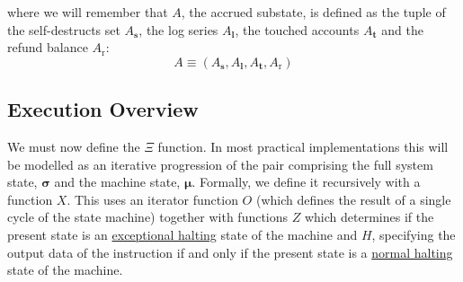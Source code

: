 \documentclass[9pt,oneside]{amsart}
\begin{document}
\begin{multicols}{2}
where we will remember that $A$, the accrued substate, is defined as the tuple of the self-destructs set $A_{\mathbf{s}}$, the log series $A_{\mathbf{l}}$, the touched accounts $A_{\mathbf{t}}$ and the refund balance $A_{\mathrm{r}}$:
\begin{equation}
A \equiv (A_{\mathbf{s}}, A_{\mathbf{l}}, A_{\mathbf{t}}, A_{\mathrm{r}})
\end{equation}

\subsection{Execution Overview}

We must now define the $\Xi$ function. In most practical implementations this will be modelled as an iterative progression of the pair comprising the full system state, $\boldsymbol{\sigma}$ and the machine state, $\boldsymbol{\mu}$. Formally, we define it recursively with a function $X$. This uses an iterator function $O$ (which defines the result of a single cycle of the state machine) together with functions \hyperlink{zhalt}{$Z$} which determines if the present state is an \hyperlink{zhalt}{exceptional halting} state of the machine and \hyperlink{hhalt}{$H$}, specifying the output data of the instruction if and only if the present state is a \hyperlink{hhalt}{normal halting} state of the machine.


\end{multicols}
\end{document}
